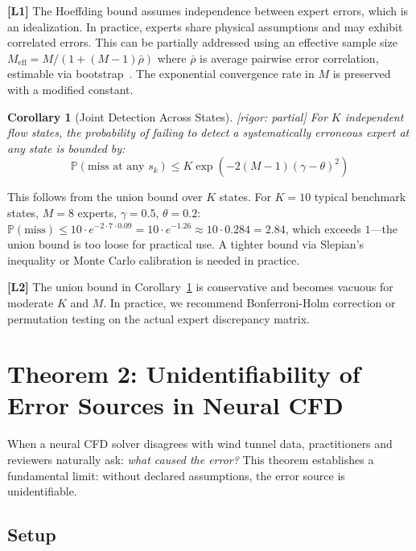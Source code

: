 \documentclass[11pt,a4paper]{article}
\newtheorem{corollary}[theorem]{Corollary}
\theoremstyle{definition}
\theoremstyle{remark}
\newcommand{\rigorPartial}{\textcolor{orange!80!black}{[rigor: partial]}}
\newcommand{\limitationTag}[1]{\textsf{\textbf{[L#1]}}}
\newcommand{\Pbb}{\mathbb{P}}
\begin{document}
\limitationTag{1} The Hoeffding bound assumes independence between expert errors, which is an idealization. In practice, experts share physical assumptions and may exhibit correlated errors.
This can be partially addressed using an effective sample size $M_{\text{eff}} = M/(1 + (M-1)\bar{\rho})$ where $\bar{\rho}$ is average pairwise error correlation, estimable via bootstrap~\citep{liang1986longitudinal}.
The exponential convergence rate in $M$ is preserved with a modified constant.

\begin{corollary}[Joint Detection Across States] \label{cor:joint}
\rigorPartial
For $K$ independent flow states, the probability of failing to detect a systematically erroneous expert at any state is bounded by:
\begin{equation}
\Pbb(\text{miss at any } s_k) \leq K \exp\left( -2(M-1)(\gamma - \theta)^2 \right)
\label{eq:joint}
\end{equation}
\end{corollary}

This follows from the union bound over $K$ states. For $K = 10$ typical benchmark states, $M = 8$ experts, $\gamma = 0.5$, $\theta = 0.2$: $\Pbb(\text{miss}) \leq 10 \cdot e^{-2 \cdot 7 \cdot 0.09} = 10 \cdot e^{-1.26} \approx 10 \cdot 0.284 = 2.84$, which exceeds $1$---the union bound is too loose for practical use.
A tighter bound via Slepian's inequality or Monte Carlo calibration is needed in practice.

\limitationTag{2} The union bound in Corollary~\ref{cor:joint} is conservative and becomes vacuous for moderate $K$ and $M$.
In practice, we recommend Bonferroni-Holm correction or permutation testing on the actual expert discrepancy matrix.

\section{Theorem 2: Unidentifiability of Error Sources in Neural CFD}

When a neural CFD solver disagrees with wind tunnel data, practitioners and reviewers naturally ask: \emph{what caused the error?}
This theorem establishes a fundamental limit: without declared assumptions, the error source is unidentifiable.

\subsection{Setup}
\end{document}
